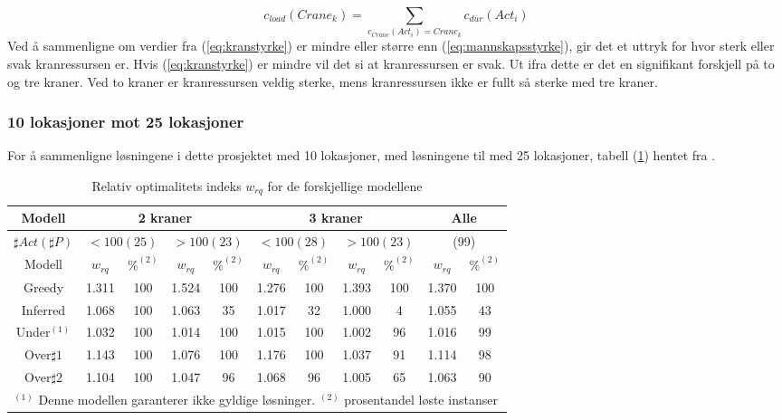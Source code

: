 \begin{equation}
c_{load}(Crane_{k}) = \sum_{c_{Crane}(Act_{i})=Crane_{k}} c_{dur}(Act_{i})
\label{eq:kranstyrke}
\end{equation}
Ved å sammenligne om verdier fra (\ref{eq:kranstyrke}) er mindre eller større enn (\ref{eq:mannskapsstyrke}), gir det et uttryk for hvor sterk eller svak kranressursen er. Hvis (\ref{eq:kranstyrke}) er mindre vil det si at kranressursen er svak. Ut ifra dette er det en signifikant forskjell på to og tre kraner. Ved to kraner er kranressursen veldig sterke, mens kranressursen ikke er fullt så sterke med tre kraner.

\subsubsection{10 lokasjoner mot 25 lokasjoner}
For å sammenligne løsningene i dette prosjektet med 10 lokasjoner, med løsningene til \bht med 25 lokasjoner, tabell (\ref{tab:resultaterSumTvedt}) hentet fra \cite{tvedtbezem}.
\begin{table}[!h]
\caption{Relativ optimalitets indeks $w_{rq}$ for de forskjellige modellene}
\begin{center}
\begin{tabular}{ | c | c | c | c | c | c | c | c | c | c | c | }
\hline
\textbf{Modell} & \multicolumn{4}{|c|}{\textbf{2 kraner}} & \multicolumn{4}{|c|}{\textbf{3 kraner}} & \multicolumn{2}{|c|}{\textbf{Alle}} \\ \hline
$\sharp Act(\sharp P)$ & \multicolumn{2}{|c|}{$< 100 (25)$} & \multicolumn{2}{|c|}{$> 100 (23)$} & \multicolumn{2}{|c|}{$< 100 (28)$} & \multicolumn{2}{|c|}{$> 100 (23)$} & \multicolumn{2}{|c|}{(99)} \\ 
\hline
Modell & $w_{rq}$ & $\%^{(2)}$ & $w_{rq}$ & $\%^{(2)}$  & $w_{rq}$ & $\%^{(2)}$ & $w_{rq}$ & $\%^{(2)}$ & $w_{rq}$ & $\%^{(2)}$ \\ \hline
Greedy & 1.311 & 100 & 1.524 & 100 & 1.276 & 100 & 1.393 & 100 & 1.370 & 100 \\
Inferred & 1.068 & 100 & 1.063 & 35 & 1.017 & 32 & 1.000 & 4 & 1.055 & 43 \\
Under$^{(1)}$ & 1.032 & 100 & 1.014 & 100 & 1.015 & 100 & 1.002 & 96 & 1.016 & 99 \\
Over$\sharp 1$ & 1.143 & 100 & 1.076 & 100 & 1.176 & 100 & 1.037 & 91 & 1.114 & 98 \\
Over$\sharp 2$ & 1.104 & 100 & 1.047 & 96 & 1.068 & 96 & 1.005 & 65 & 1.063 & 90 \\
\hline
\multicolumn{11}{l}{\begin{minipage}{6in}$^{(1)}$ Denne modellen garanterer ikke gyldige løsninger.
$^{(2)}$ prosentandel løste instanser \end{minipage}}
\end{tabular}
\end{center}
\label{tab:resultaterSumTvedt}
\end{table}
